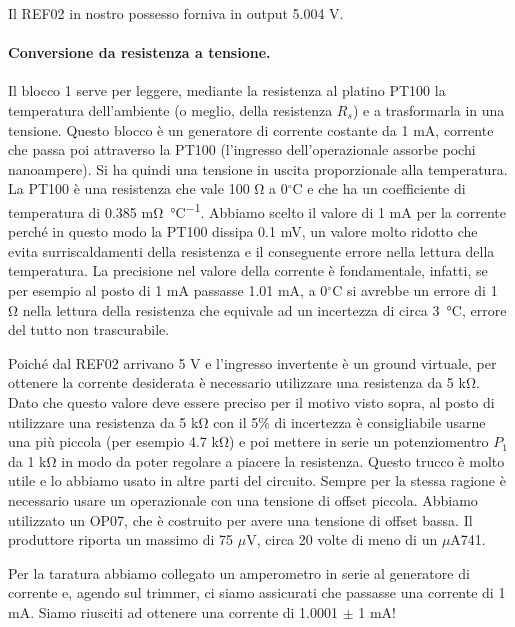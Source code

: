 Il REF02 in nostro possesso forniva in output 5.004 V. 

\paragraph{Conversione da resistenza a tensione.}

Il blocco 1 serve per leggere, mediante la resistenza al platino PT100 la temperatura dell'ambiente (o meglio, della
resistenza $R_s$) e a trasformarla in una tensione. Questo blocco è un generatore di corrente costante da 1 mA, corrente
che passa poi attraverso la PT100 (l'ingresso dell'operazionale assorbe pochi nanoampere). Si ha quindi una tensione in uscita
proporzionale alla temperatura.
La PT100 è una resistenza che vale 100 \si{\ohm} a 0$^\circ$C e che ha un coefficiente di temperatura di 0.385 \si{\milli\ohm\per\celsius}. Abbiamo scelto il valore di 1 mA per la corrente perché in questo modo la PT100 dissipa 0.1 mV, un valore molto
ridotto che evita surriscaldamenti della resistenza e il conseguente errore nella lettura della temperatura.
La precisione nel valore della corrente è fondamentale, infatti, se per esempio al posto di 1 mA passasse 1.01 mA,
a 0$^\circ$C si avrebbe un errore di 1 \si{\ohm} nella lettura della resistenza che equivale ad un incertezza di circa \SI{3}{\celsius},
errore del tutto non trascurabile.

Poiché dal REF02 arrivano 5 V e l'ingresso invertente è un ground virtuale, per ottenere la corrente desiderata
è necessario utilizzare una resistenza da 5 \si{\kilo\ohm}. Dato che questo valore deve essere preciso per il motivo visto sopra, al posto
di utilizzare una resistenza da 5 \si{\kilo\ohm} con il 5\% di incertezza è consigliabile usarne una più piccola
(per esempio 4.7 \si{\kilo\ohm}) e poi mettere in serie un potenziomentro $P_1$ da 1 \si{\kilo\ohm}
in modo da poter regolare a piacere la resistenza. Questo trucco è molto utile e lo abbiamo usato in altre parti del circuito.
Sempre per la stessa ragione è necessario usare un operazionale con una tensione di offset piccola.
Abbiamo utilizzato un OP07, che è costruito per avere una tensione
di offset bassa. Il produttore riporta un massimo di 75 $\mu$V, circa 20 volte di meno di un $\mu$A741. 

Per la taratura abbiamo collegato un amperometro in serie al generatore di corrente e, agendo sul trimmer,
ci siamo assicurati che passasse una corrente di 1 mA. Siamo riusciti ad ottenere una corrente di 1.0001 $\pm$ 1 mA!

